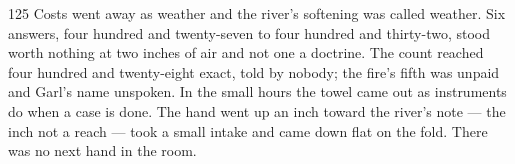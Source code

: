 \begin{CRchronicle}{125}
Costs went away as weather and the river’s softening was called weather. Six answers, four hundred and twenty-seven to four hundred and thirty-two, stood worth nothing at two inches of air and not one a doctrine. The count reached four hundred and twenty-eight exact, told by nobody; the fire’s fifth was unpaid and Garl’s name unspoken. In the small hours the towel came out as instruments do when a case is done. The hand went up an inch toward the river’s note — the inch not a reach — took a small intake and came down flat on the fold. There was no next hand in the room.
\end{CRchronicle}

